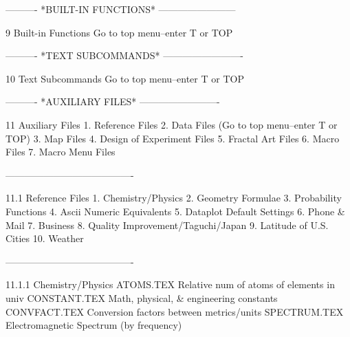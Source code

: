  
 
 
 
 
 
 
 
 
 
 
 
 
 
 
 
 
 
 
 
 
 
 
 
 
 
 
 
 
 
 
 
 
 
 
 
 
 
 
 
 
 
 
 
 
 
 
 
 
----------  *BUILT-IN FUNCTIONS*  ------------------------
 
9
Built-in Functions
   Go to top menu--enter T or TOP
 
----------  *TEXT SUBCOMMANDS*  -------------------------
 
10
Text Subcommands
   Go to top menu--enter T or TOP
 
----------  *AUXILIARY FILES*  -------------------------
 
11
Auxiliary Files
   1. Reference Files
   2. Data Files  (Go to top menu--enter T or TOP)
   3. Map Files
   4. Design of Experiment Files
   5. Fractal Art Files
   6. Macro Files
   7. Macro Menu Files
 
----------------------------------------
 
11.1
Reference Files
   1. Chemistry/Physics
   2. Geometry Formulae
   3. Probability Functions
   4. Ascii Numeric Equivalents
   5. Dataplot Default Settings
   6. Phone & Mail
   7. Business
   8. Quality Improvement/Taguchi/Japan
   9. Latitude of U.S. Cities
   10. Weather
 
----------------------------------------
 
11.1.1
Chemistry/Physics
      ATOMS.TEX     Relative num of atoms of elements in univ
      CONSTANT.TEX  Math, physical, & engineering constants
      CONVFACT.TEX  Conversion factors between metrics/units
      SPECTRUM.TEX  Electromagnetic Spectrum (by frequency)
 
 
 
